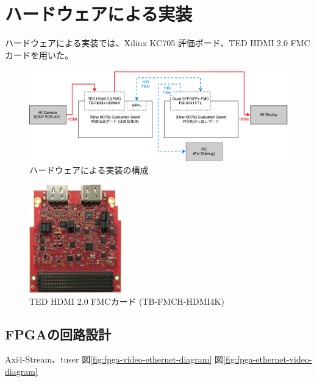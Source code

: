 \section{ハードウェアによる実装}

ハードウェアによる実装では、Xilinx KC705 評価ボード、TED HDMI 2.0 FMCカードを用いた。

\begin{figure}[htbp]
    \begin{center}
        \includegraphics[bb=0 0 841 299,width=15.5cm]{img/fpga-implement-flow.pdf}
    \end{center}
    \caption{ハードウェアによる実装の構成}
    \label{fig:fpga-implement-flow}
\end{figure}


\begin{figure}[htbp]
    \begin{center}
        \includegraphics[bb=0 0 137 161,width=4cm]{img/ted-4k-fmc-card.jpg}
    \end{center}
    \caption{TED HDMI 2.0 FMCカード (TB-FMCH-HDMI4K)}
    \label{fig:ted-4k-fmc-card}
\end{figure}

\subsection{FPGAの回路設計}

Axi4-Stream、tuser
図\ref{fig:fpga-video-ethernet-diagram}
図\ref{fig:fpga-ethernet-video-diagram}

